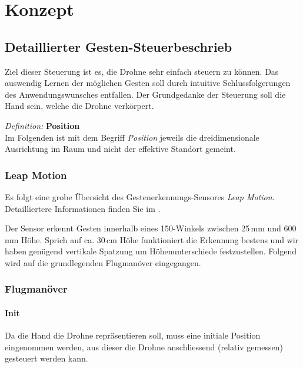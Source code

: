 \chapter{Konzept}

\section{Detaillierter Gesten-Steuerbeschrieb}

Ziel dieser Steuerung ist es, die Drohne sehr einfach steuern zu können.
Das auswendig Lernen der möglichen Gesten soll durch intuitive Schlussfolgerungen des Anwendungswunsches entfallen.
Der Grundgedanke der Steuerung soll die Hand sein, welche die Drohne verkörpert.

\begin{framed}
\textit{Definition: }\textbf{Position}\\
Im Folgenden ist mit dem Begriff \textit{Position} jeweils die dreidimensionale Ausrichtung im Raum und nicht der effektive Standort gemeint.
\end{framed}

\subsection{Leap Motion}
Es folgt eine grobe Übersicht des Gestenerkennungs-Sensores \textit{Leap Motion}.
Detailliertere Informationen finden Sie im .

Der Sensor erkennt Gesten innerhalb eines 150\textdegree-Winkels zwischen 25\,mm und 600\,mm Höhe.
Sprich auf ca. 30\,cm Höhe funktioniert die Erkennung bestens und wir haben genügend vertikale Spatzung um Höhenunterschiede festzustellen.
Folgend wird auf die grundlegenden Flugmanöver eingegangen.


\subsection{Flugmanöver}

\subsubsection{Init}

Da die Hand die Drohne repräsentieren soll, muss eine initiale Position eingenommen werden, aus dieser die Drohne anschliessend (relativ gemessen) gesteuert werden kann.

